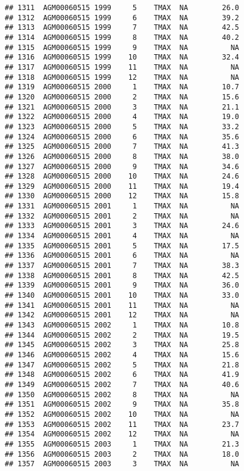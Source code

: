 \documentclass{article}\usepackage[]{graphicx}\usepackage[]{color}
\makeatletter
\newenvironment{kframe}{%
 \def\at@end@of@kframe{}%
 \ifinner\ifhmode%
  \def\at@end@of@kframe{\end{minipage}}%
  \begin{minipage}{\columnwidth}%
 \fi\fi%
 \def\FrameCommand##1{\hskip\@totalleftmargin \hskip-\fboxsep
 \colorbox{shadecolor}{##1}\hskip-\fboxsep
     \hskip-\linewidth \hskip-\@totalleftmargin \hskip\columnwidth}%
 \MakeFramed {\advance\hsize-\width
   \@totalleftmargin\z@ \linewidth\hsize
   \@setminipage}}%
 {\par\unskip\endMakeFramed%
 \at@end@of@kframe}
\newenvironment{knitrout}{}{} %
\makeatother
\begin{document}
\begin{knitrout}
\begin{kframe}
\begin{verbatim}
## 1311  AGM00060515 1999     5    TMAX  NA        26.0
## 1312  AGM00060515 1999     6    TMAX  NA        39.2
## 1313  AGM00060515 1999     7    TMAX  NA        42.5
## 1314  AGM00060515 1999     8    TMAX  NA        40.2
## 1315  AGM00060515 1999     9    TMAX  NA          NA
## 1316  AGM00060515 1999    10    TMAX  NA        32.4
## 1317  AGM00060515 1999    11    TMAX  NA          NA
## 1318  AGM00060515 1999    12    TMAX  NA          NA
## 1319  AGM00060515 2000     1    TMAX  NA        10.7
## 1320  AGM00060515 2000     2    TMAX  NA        15.6
## 1321  AGM00060515 2000     3    TMAX  NA        21.1
## 1322  AGM00060515 2000     4    TMAX  NA        19.0
## 1323  AGM00060515 2000     5    TMAX  NA        33.2
## 1324  AGM00060515 2000     6    TMAX  NA        35.6
## 1325  AGM00060515 2000     7    TMAX  NA        41.3
## 1326  AGM00060515 2000     8    TMAX  NA        38.0
## 1327  AGM00060515 2000     9    TMAX  NA        34.6
## 1328  AGM00060515 2000    10    TMAX  NA        24.6
## 1329  AGM00060515 2000    11    TMAX  NA        19.4
## 1330  AGM00060515 2000    12    TMAX  NA        15.8
## 1331  AGM00060515 2001     1    TMAX  NA          NA
## 1332  AGM00060515 2001     2    TMAX  NA          NA
## 1333  AGM00060515 2001     3    TMAX  NA        24.6
## 1334  AGM00060515 2001     4    TMAX  NA          NA
## 1335  AGM00060515 2001     5    TMAX  NA        17.5
## 1336  AGM00060515 2001     6    TMAX  NA          NA
## 1337  AGM00060515 2001     7    TMAX  NA        38.3
## 1338  AGM00060515 2001     8    TMAX  NA        42.5
## 1339  AGM00060515 2001     9    TMAX  NA        36.0
## 1340  AGM00060515 2001    10    TMAX  NA        33.0
## 1341  AGM00060515 2001    11    TMAX  NA          NA
## 1342  AGM00060515 2001    12    TMAX  NA          NA
## 1343  AGM00060515 2002     1    TMAX  NA        10.8
## 1344  AGM00060515 2002     2    TMAX  NA        19.5
## 1345  AGM00060515 2002     3    TMAX  NA        25.8
## 1346  AGM00060515 2002     4    TMAX  NA        15.6
## 1347  AGM00060515 2002     5    TMAX  NA        21.8
## 1348  AGM00060515 2002     6    TMAX  NA        41.9
## 1349  AGM00060515 2002     7    TMAX  NA        40.6
## 1350  AGM00060515 2002     8    TMAX  NA          NA
## 1351  AGM00060515 2002     9    TMAX  NA        35.8
## 1352  AGM00060515 2002    10    TMAX  NA          NA
## 1353  AGM00060515 2002    11    TMAX  NA        23.7
## 1354  AGM00060515 2002    12    TMAX  NA          NA
## 1355  AGM00060515 2003     1    TMAX  NA        21.3
## 1356  AGM00060515 2003     2    TMAX  NA        18.0
## 1357  AGM00060515 2003     3    TMAX  NA          NA

\end{verbatim}
\end{kframe}
\end{knitrout}
\end{document}
